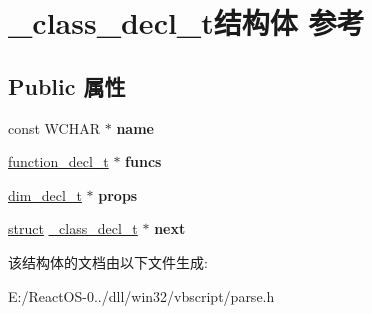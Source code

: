 \hypertarget{struct__class__decl__t}{}\section{\+\_\+class\+\_\+decl\+\_\+t结构体 参考}
\label{struct__class__decl__t}
\subsection*{Public 属性}
\begin{DoxyCompactItemize}
\item 
\mbox{\label{struct__class__decl__t_a86d1d284119a0219d570c4f3f814c5c7}} 
const W\+C\+H\+AR $\ast$ {\bfseries name}
\item 
\mbox{\label{struct__class__decl__t_ab7e8fd5e0f681f91ddbedef578161273}} 
\hyperlink{struct__function__decl__t}{function\+\_\+decl\+\_\+t} $\ast$ {\bfseries funcs}
\item 
\mbox{\label{struct__class__decl__t_ae9ea541e6657f0b3e7f85f1a928129cd}} 
\hyperlink{struct__dim__decl__t}{dim\+\_\+decl\+\_\+t} $\ast$ {\bfseries props}
\item 
\mbox{\label{struct__class__decl__t_aa3b84b79805b2536a643dc228c3abdfb}} 
\hyperlink{interfacestruct}{struct} \hyperlink{struct__class__decl__t}{\+\_\+class\+\_\+decl\+\_\+t} $\ast$ {\bfseries next}
\end{DoxyCompactItemize}


该结构体的文档由以下文件生成\+:\begin{DoxyCompactItemize}
\item 
E\+:/\+React\+O\+S-\/0../dll/win32/vbscript/parse.\+h\end{DoxyCompactItemize}
